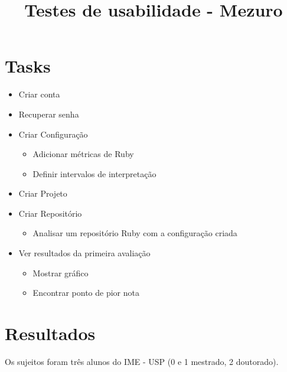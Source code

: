 \documentclass[11pt,a4paper]{article}
\title{Testes de usabilidade - Mezuro}
\begin{document}
  \maketitle

  \section{Tasks}
  \begin{itemize}
    \item Criar conta
    \item Recuperar senha
    \item Criar Configuração
      \begin{itemize}
        \item Adicionar métricas de Ruby
        \item Definir intervalos de interpretação
      \end{itemize}
    \item Criar Projeto
    \item Criar Repositório
      \begin{itemize}
        \item Analisar um repositório Ruby com a configuração criada
      \end{itemize}
    \item Ver resultados da primeira avaliação
      \begin{itemize}
        \item Mostrar gráfico
        \item Encontrar ponto de pior nota
      \end{itemize}
  \end{itemize}

  \section{Resultados}
  Os sujeitos foram três alunos do IME - USP (0 e 1 mestrado, 2 doutorado).

  
  
  
\end{document}
